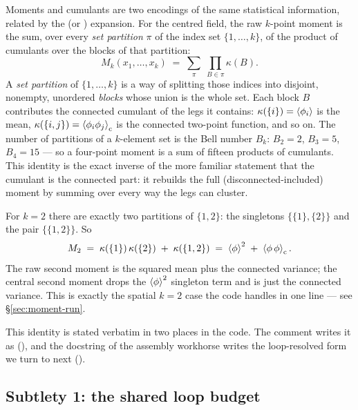 Moments and cumulants are two encodings of the same statistical information,
related by the  (or ) expansion. For the
centred field, the raw $k$-point moment is the sum, over every \emph{set
partition} $\pi$ of the index set $\{1,\ldots,k\}$, of the product of cumulants
over the blocks of that partition:
\begin{equation}
  M_k(x_1,\ldots,x_k)
  \;=\; \sum_{\pi}\;\prod_{B\in\pi}\kappa\!\left(B\right).
  \label{eq:moment-setpart}
\end{equation}
A \emph{set partition} of $\{1,\ldots,k\}$ is a way of splitting those indices
into disjoint, nonempty, unordered \emph{blocks} whose union is the whole set.
Each block $B$ contributes the connected cumulant of the legs it contains:
$\kappa(\{i\})=\left\langle \phi_i \right\rangle$ is the mean, $\kappa(\{i,j\})=\left\langle \phi_i\phi_j \right\rangle_{\mathrm c}$
is the connected two-point function, and so on. The number of partitions of a
$k$-element set is the Bell number $B_k$: $B_2=2$, $B_3=5$, $B_4=15$ --- so a
four-point moment is a sum of fifteen products of cumulants. This identity is the
exact inverse of the more familiar statement that the cumulant is the connected
part: it rebuilds the full (disconnected-included) moment by summing over every
way the legs can cluster.

\begin{example}\label{ex:k2-moment}
For $k=2$ there are exactly two partitions of $\{1,2\}$: the singletons
$\{\{1\},\{2\}\}$ and the pair $\{\{1,2\}\}$. So
\[
  M_2 \;=\; \kappa(\{1\})\,\kappa(\{2\}) \;+\; \kappa(\{1,2\})
       \;=\; \left\langle \phi \right\rangle^2 \;+\; \left\langle \phi\,\phi \right\rangle_{\mathrm c}.
\]
The raw second moment is the squared mean plus the connected variance; the
central second moment drops the $\left\langle \phi \right\rangle^2$ singleton term and is just the
connected variance. This is exactly the spatial $k=2$ case the code handles in
one line --- see \S\ref{sec:moment-run}.
\end{example}

This identity is stated verbatim in two places in the code. The
 comment writes it as
(), and the docstring of the assembly
workhorse  writes the loop-resolved form we
turn to next ().

\subsection{Subtlety 1: the shared loop budget}

